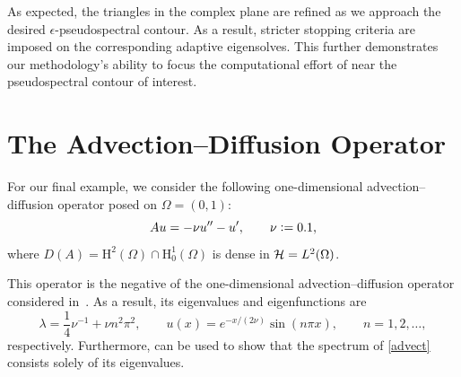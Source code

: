 

As expected, the triangles in the complex plane are refined as we approach the desired $\epsilon$-pseudospectral contour. As a result, stricter stopping criteria are imposed on the corresponding adaptive eigensolves. This further demonstrates our methodology's ability to focus the computational effort of  near the pseudospectral contour of interest.

% 

\section{The Advection--Diffusion Operator}

For our final example, we consider the following one-dimensional advection--diffusion operator posed on $\Omega = (0, 1)$:
\begin{equation} \label{advect}
    Au = - \nu u'' - u', \qquad \nu \vcentcolon= 0.1,
\end{equation}
where $D(A) = \text{H}^2(\Omega) \cap \text{H}_0^1(\Omega)$ is dense in $\mathcal{H} = L^2(\Omega)$.


This operator is the negative of the one-dimensional advection--diffusion operator considered in~\cite[Section~3.12]{Nick}. As a result, its eigenvalues and eigenfunctions are 
\begin{equation}
    \lambda = \frac{1}{4} \nu^{-1} + \nu n^2 \pi^2, \qquad u(x) = e^{-x/(2\nu)} \sin(n \pi x), \qquad n = 1, 2, \dots,
\end{equation}
respectively. Furthermore, \cite[Theorem~1]{AdvectPaper} can be used to show that the spectrum of \eqref{advect} consists solely of its eigenvalues. 


